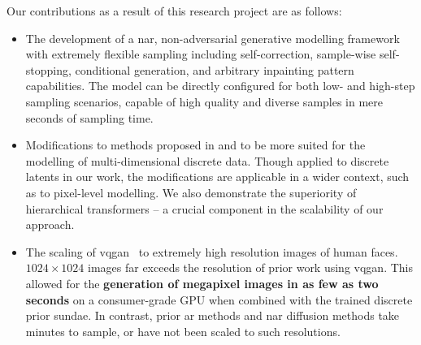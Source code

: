 Our contributions as a result of this research project are as follows:
\begin{itemize}
    \item
        The development of a \acrlong{nar}, non-adversarial generative modelling
        framework with extremely flexible sampling including self-correction,
        sample-wise self-stopping, conditional generation, and arbitrary
        inpainting pattern capabilities. The model can be directly configured
        for both low- and high-step sampling scenarios, capable of high
        quality and diverse samples in mere seconds of sampling time.
    \item
        Modifications to methods proposed in \citet{savinov2022stepunrolled} and
        \citet{nawrot2021hierarchical} to be more suited for the modelling of
        multi-dimensional discrete data. Though applied to discrete latents in
        our work, the modifications are applicable in a wider context,
        such as to pixel-level modelling. We also demonstrate the superiority of
        hierarchical transformers -- a crucial component in the scalability
        of our approach. 
    \item
        The scaling of \gls{vqgan}~\cite{esser2021taming} to extremely high
        resolution images of human faces. $1024 \times 1024$ images far exceeds
        the resolution of prior work using \gls{vqgan}. This allowed for the
        \textbf{generation of megapixel images in as few as two seconds} on a
        consumer-grade GPU when combined with the trained discrete prior
        \gls{sundae}. In contrast, prior \gls{ar} methods and \gls{nar}
        diffusion methods take minutes to sample, or have not been scaled to
        such resolutions.
\end{itemize}
